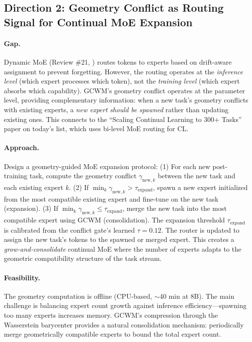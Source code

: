\documentclass[11pt]{article}
\begin{document}
\subsection{Direction 2: Geometry Conflict as Routing Signal for Continual MoE Expansion}

\paragraph{Gap.}
Dynamic MoE (Review \#21, \cite{dynamicmoe}) routes tokens to experts based on drift-aware assignment to prevent forgetting. However, the routing operates at the \emph{inference level} (which expert processes which token), not the \emph{training level} (which expert absorbs which capability). GCWM's geometry conflict operates at the parameter level, providing complementary information: when a new task's geometry conflicts with existing experts, a \emph{new expert should be spawned} rather than updating existing ones. This connects to the ``Scaling Continual Learning to 300+ Tasks'' paper on today's list, which uses bi-level MoE routing for CL.

\paragraph{Approach.}
Design a geometry-guided MoE expansion protocol: (1) For each new post-training task, compute the geometry conflict $\gamma_{\mathrm{new},k}$ between the new task and each existing expert $k$. (2) If $\min_k \gamma_{\mathrm{new},k} > \tau_{\mathrm{expand}}$, spawn a new expert initialized from the most compatible existing expert and fine-tune on the new task (expansion). (3) If $\min_k \gamma_{\mathrm{new},k} \leq \tau_{\mathrm{expand}}$, merge the new task into the most compatible expert using GCWM (consolidation). The expansion threshold $\tau_{\mathrm{expand}}$ is calibrated from the conflict gate's learned $\tau = 0.12$. The router is updated to assign the new task's tokens to the spawned or merged expert. This creates a \emph{grow-and-consolidate} continual MoE where the number of experts adapts to the geometric compatibility structure of the task stream.

\paragraph{Feasibility.}
The geometry computation is offline (CPU-based, $\sim$40 min at 8B). The main challenge is balancing expert count growth against inference efficiency---spawning too many experts increases memory. GCWM's compression through the Wasserstein barycenter provides a natural consolidation mechanism: periodically merge geometrically compatible experts to bound the total expert count.
\end{document}
